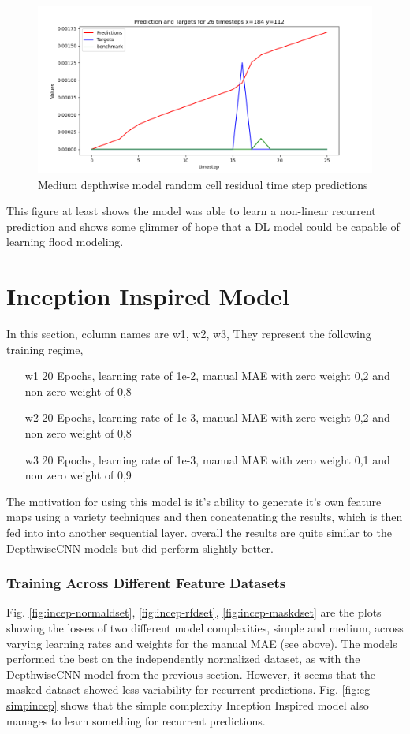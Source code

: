 \begin{figure}[tbph]
	\centering
	\includegraphics[width=0.8\linewidth, height=0.3\textheight]{"Figures/Results/feature_manip/medium_depthwise_diff_train_4_custom_mae_weighted_7_20 epochs_norm_independant_normal_292_random_cell_residual"}
	\caption[Medium depthwise model random cell residual time step predictions]{Medium depthwise model random cell residual time step predictions}
	\label{fig:random-success}
\end{figure}

This figure at least shows the model was able to learn a non-linear recurrent  prediction and shows some glimmer of hope that a DL model could be capable of learning flood modeling.


\section{Inception Inspired Model}
In this section, column names are w1, w2, w3, They represent the following training regime,
\begin{enumerate}
	\item[w1] 20 Epochs, learning rate of 1e-2, manual MAE with zero weight 0,2 and non zero weight of 0,8
	\item[w2] 20 Epochs, learning rate of 1e-3, manual MAE with zero weight 0,2 and non zero weight of 0,8
	\item[w3] 20 Epochs, learning rate of 1e-3, manual MAE with zero weight 0,1 and non zero weight of 0,9
\end{enumerate}

The motivation for using this model is it's ability to generate it's own feature maps using a variety techniques and then concatenating the results, which is then fed into into another sequential layer. overall the results are quite similar to the DepthwiseCNN models but did perform slightly better.
\subsubsection*{Training Across Different Feature Datasets}
Fig. \ref{fig:incep-normaldset}, \ref{fig:incep-rfdset}, \ref{fig:incep-maskdset} are the plots showing the losses of two different model complexities, simple and medium, across varying learning rates and weights for the manual MAE (see above). The models performed the best on the independently normalized dataset, as with the DepthwiseCNN model from the previous section. However, it seems that the masked dataset showed  less variability for recurrent predictions. Fig. \ref{fig:eg-simpincep} shows that the simple complexity Inception Inspired model also manages to learn something for recurrent predictions.


